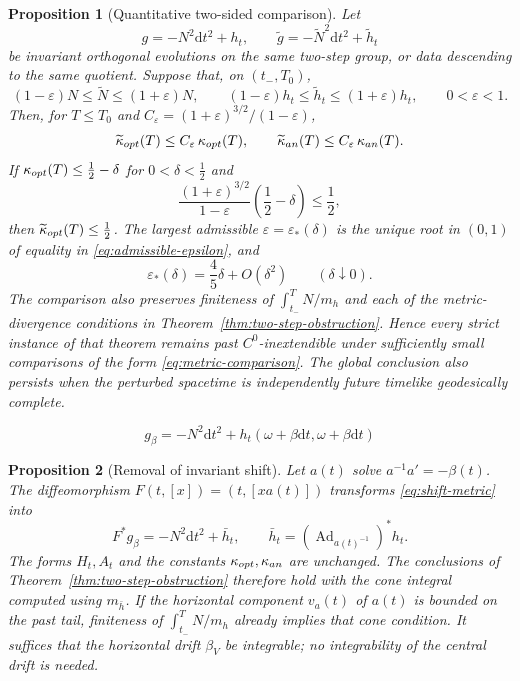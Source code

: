 \documentclass[10pt,a4paper]{amsart}
\newtheorem{proposition}{Proposition}
\newcommand{\Ad}{\operatorname{Ad}}
\newcommand{\dd}{\mathrm d}
\newcommand{\eps}{\varepsilon}
\begin{document}
\begin{proposition}[Quantitative two-sided comparison]
\label{thm:stability}
Let
\[
 g=-N^2\dd t^2+h_t,\qquad
 \widetilde g=-\widetilde N^2\dd t^2+\widetilde h_t
\]
be invariant orthogonal evolutions on the same two-step group, or data
descending to the same quotient.  Suppose that, on $(t_-,T_0)$,
\begin{equation}
 (1-\eps)N\le\widetilde N\le(1+\eps)N,\qquad
 (1-\eps)h_t\le\widetilde h_t\le(1+\eps)h_t,\qquad 0<\eps<1.
 \label{eq:metric-comparison}
\end{equation}
Then, for $T\le T_0$ and
$C_\eps=(1+\eps)^{3/2}/(1-\eps)$,
\begin{equation}
 \widetilde\kappa_{\rm opt}(T)
 \le C_\eps\,\kappa_{\rm opt}(T),\qquad
 \widetilde\kappa_{\rm an}(T)
 \le C_\eps\,\kappa_{\rm an}(T).
 \label{eq:kappa-stability}
\end{equation}
If $\kappa_{\rm opt}(T)\le\tfrac12-\delta$ for
$0<\delta<\tfrac12$ and
\begin{equation}
 \frac{(1+\eps)^{3/2}}{1-\eps}
 \left(\frac12-\delta\right)\le\frac12,
 \label{eq:admissible-epsilon}
\end{equation}
then $\widetilde\kappa_{\rm opt}(T)\le\tfrac12$.
The largest admissible $\eps=\eps_*(\delta)$ is the unique root in
$(0,1)$ of equality in \eqref{eq:admissible-epsilon}, and
\begin{equation}
 \eps_*(\delta)=\frac45\delta+O(\delta^2)
 \qquad(\delta\downarrow0).
 \label{eq:epsilon-expansion}
\end{equation}
The comparison also preserves finiteness of $\int_{t_-}^T N/m_h$ and
each of the metric-divergence conditions in
Theorem~\ref{thm:two-step-obstruction}.
Hence every strict instance of that theorem remains past
$C^0$-inextendible under sufficiently small comparisons of the form
\eqref{eq:metric-comparison}.
The global conclusion also persists when the perturbed spacetime is
independently future timelike geodesically complete.
\end{proposition}

\begin{equation}
 g_\beta=-N^2\dd t^2+h_t(\omega+\beta\dd t,\omega+\beta\dd t)
 \label{eq:shift-metric}
\end{equation}

\begin{proposition}[Removal of invariant shift]
\label{prop:shift}
Let $a(t)$ solve $a^{-1}a'=-\beta(t)$.
The diffeomorphism $F(t,[x])=(t,[xa(t)])$ transforms
\eqref{eq:shift-metric} into
\[
 F^*g_\beta=-N^2\dd t^2+\bar h_t,\qquad
 \bar h_t=(\Ad_{a(t)^{-1}})^*h_t.
\]
The forms $H_t,A_t$ and the constants
$\kappa_{\rm opt},\kappa_{\rm an}$ are unchanged.
The conclusions of Theorem~\ref{thm:two-step-obstruction} therefore
hold with the cone integral computed using $m_{\bar h}$.
If the horizontal component $v_a(t)$ of $a(t)$ is bounded on the
past tail, finiteness of $\int_{t_-}^T N/m_h$ already implies that
cone condition.
It suffices that the horizontal drift $\beta_V$ be integrable;
no integrability of the central drift is needed.
\end{proposition}
\end{document}
